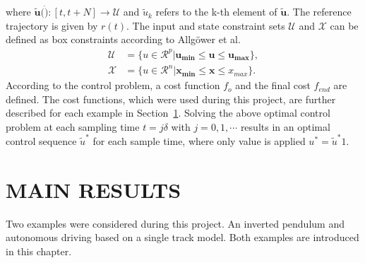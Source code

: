 \documentclass[letterpaper, 10 pt, conference]{ieeeconf}  %
\begin{document}
where $\boldsymbol{\tilde{u}}(\dot):[t,t+N] \rightarrow \mathcal{U}$ and $\tilde{u}_k$ refers to the k-th element of $\boldsymbol{\tilde{u}}$. The reference trajectory is given by $r(t)$. The input and state constraint sets $\mathcal{U}$ and $\mathcal{X}$ can be defined as box constraints according to Allgöwer et al.~\cite{allgeowernonlinear}
\begin{align}
\mathcal{U} &= \{u \in \mathcal{R}^p|\boldsymbol{u_{min}}\leq \boldsymbol{u} \leq \boldsymbol{u_{max}}\},\\
\mathcal{X} &= \{u \in \mathcal{R}^n|\boldsymbol{x_{min}}\leq \boldsymbol{x} \leq x_{max}\}.
\end{align}
According to the control problem, a cost function $f_o$ and the final cost $f_{end}$ are defined. The cost functions, which were used during this project, are further described for each example in Section~\ref{main_results}.
Solving the above optimal control problem at each sampling time $t= j\delta$  with $j=0,1,\cdots$ results in an optimal control sequence $\tilde{u}^*$ for each sample time, where only value is applied $u^*=\tilde{u}^*1$.



\section{MAIN RESULTS}\label{main_results}
Two examples were considered during this project. An inverted pendulum and autonomous driving based on a single track model. Both examples are introduced in this chapter.\\
\end{document}
